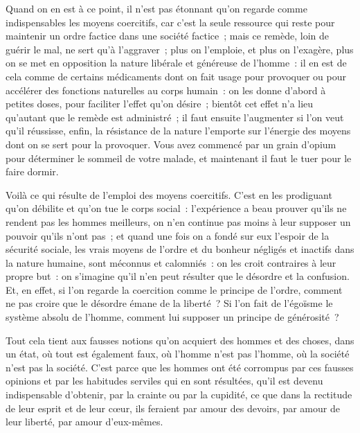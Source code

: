 \documentclass[french,twoside]{book} %
\begin{document}
Quand on en est à ce point, il n’est pas étonnant qu’on regarde comme indispensables les moyens coercitifs, car c’est la seule ressource qui reste pour maintenir un ordre factice dans une société factice ; mais ce remède, loin de guérir le mal, ne sert qu’à l’aggraver ; plus on l’emploie, et plus on l’exagère, plus on se met en opposition la nature libérale et généreuse de l’homme : il en est de cela comme de certains médicaments dont on fait usage pour provoquer ou pour accélérer des fonctions naturelles au corps humain : on les donne d’abord à petites doses, pour faciliter l’effet qu’on désire ; bientôt cet effet n’a lieu qu’autant que le remède est administré ; il faut ensuite l’augmenter si l’on veut qu’il réussisse, enfin, la résistance de la nature l’emporte sur l’énergie des moyens dont on se sert pour la provoquer. Vous avez commencé par un grain d’opium pour déterminer le sommeil de votre malade, et maintenant il faut le tuer pour le faire dormir.\par
Voilà ce qui résulte de l’emploi des moyens coercitifs. C’est en les prodiguant qu’on débilite et qu’on tue le corps social : l’expérience a beau prouver qu’ils ne rendent pas les hommes meilleurs, on n’en continue pas moins à leur supposer un pouvoir qu’ils n’ont pas ; et quand une fois on a fondé sur eux l’espoir de la sécurité sociale, les vrais moyens de l’ordre et du bonheur négligés et inactifs dans la nature humaine, sont méconnus et calomniés : on les croit contraires à leur propre but : on s’imagine qu’il n’en peut résulter que le désordre et la confusion. Et, en effet, si l’on regarde la coercition comme le principe de l’ordre, comment ne pas croire que le désordre émane de la liberté ? Si l’on fait de l’égoïsme le système absolu de l’homme, comment lui supposer un principe de générosité ?\par
Tout cela tient aux fausses notions qu’on acquiert des hommes et des choses, dans un état, où tout est également faux, où l’homme n’est pas l’homme, où la société n’est pas la société. C’est parce que les hommes ont été corrompus par ces fausses opinions et par les habitudes serviles qui en sont résultées, qu’il est devenu indispensable d’obtenir, par la crainte ou par la cupidité, ce que dans la rectitude de leur esprit et de leur cœur, ils feraient par amour des devoirs, par amour de leur liberté, par amour d’eux-mêmes.\par
\end{document}
